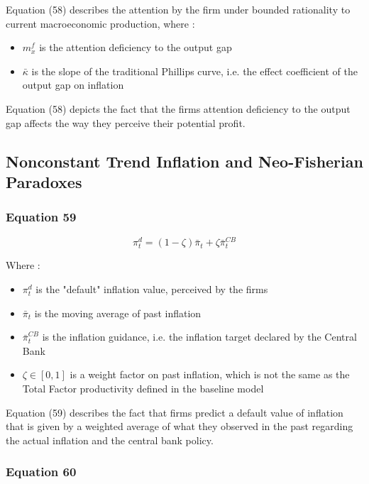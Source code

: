\documentclass{article}
\begin{document}
Equation (58) describes the attention by the firm under bounded rationality to current macroeconomic production, where : 
\begin{itemize}
    \item $m^{f}_{x}$ is the attention deficiency to the output gap
    \item $\bar{\kappa}$ is the slope of the traditional Phillips curve, i.e. the effect coefficient of the output gap on inflation
\end{itemize}

Equation (58) depicts the fact that the firms attention deficiency to the output gap affects the way they perceive their potential profit.

\subsection{Nonconstant Trend Inflation and Neo-Fisherian Paradoxes}

\subsubsection*{Equation 59}

\begin{equation}\tag{59}
    \pi^{d}_{t}=(1-\zeta)\bar{\pi}_{t}+\zeta\bar{\pi}_{t}^{CB}
\end{equation}

Where : 
\begin{itemize}
    \item $\pi^{d}_{t}$ is the "default" inflation value, perceived by the firms
    \item $\bar{\pi}_{t}$ is the moving average of past inflation 
    \item $\bar{\pi}_{t}^{CB}$ is the inflation guidance, i.e. the inflation target declared by the Central Bank
    \item $\zeta\in\left[0,1\right]$ is a weight factor on past inflation, which is not the same as the Total Factor productivity defined in the baseline model
\end{itemize}

Equation (59) describes the fact that firms predict a default value of inflation that is given by a weighted average of what they observed in the past regarding the actual inflation and the central bank policy. 

\subsubsection*{Equation 60}
\end{document}

